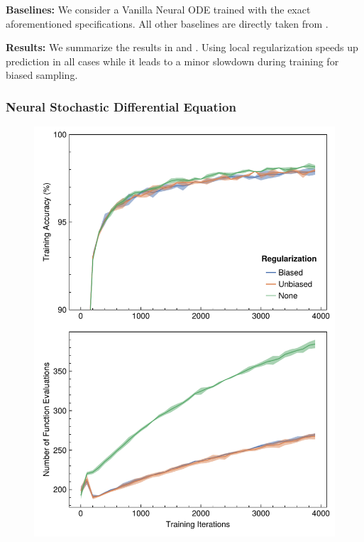 \textbf{Baselines:} We consider a Vanilla Neural ODE trained with the exact aforementioned specifications. All other baselines are directly taken from \citet{pal2021opening}.

\textbf{Results:} We summarize the results in  and . Using local regularization speeds up prediction in all cases while it leads to a minor slowdown during training for biased sampling.


\subsubsection{Neural Stochastic Differential Equation}
\label{subsubsec:mnist_nsde}

\begin{figure}
  \centering
  \includegraphics[width=\linewidth]{../figures/local_regularizing_neural_des/mnist_sde.pdf}
  \label{fig:mnist_nsde_localreg}
\end{figure}

